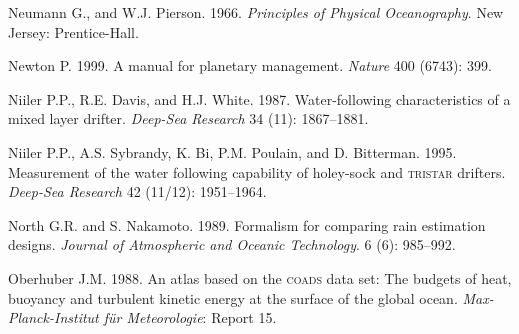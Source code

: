 \begin{thebibliography}{999}
Neumann G., and W.J. Pierson.  1966. \textit{Principles of Physical
  Oceanography}.  New Jersey: Prentice-Hall.
%

Newton P.  1999. A manual for planetary management. \textit{Nature}
400 (6743): 399.
%

Niiler P.P., R.E. Davis, and H.J. White.  1987. Water-following
characteristics of a mix\-ed layer drifter. \textit{Deep-Sea Research}
34 (11): 1867--1881.
%

Niiler P.P., A.S. Sybrandy, K. Bi, P.M. Poulain, and
D. Bitterman. 1995.  Measurement of the water following capability of
holey-sock and \textsc{tristar} drifters. \textit{Deep-Sea Research}
42 (11/12): 1951--1964.
%

North G.R. and S. Nakamoto.  1989. Formalism for comparing rain
estimation designs. \textit{Journal of Atmospheric and Oceanic
  Technology}. 6 (6): 985--992.
%

Oberhuber J.M.  1988. An atlas based on the \textsc{coads} data set:
The budgets of heat, buoyancy and turbulent kinetic energy at the
surface of the global ocean. \textit{Max-Planck-Institut f\"{u}r
  Meteorologie}: Report 15.
%


\end{thebibliography}
